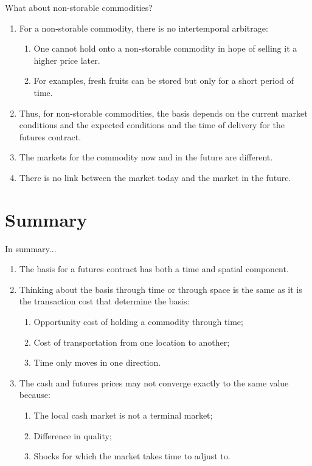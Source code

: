 \documentclass[table,xcolor=pdftex,dvipsnames, handout]{beamer}\usepackage[]{graphicx}\usepackage[]{color}
\begin{document}

\begin{frame}{What about non-storable commodities?}
\begin{enumerate}[label=\textbullet]
    \item For a non-storable commodity, there is no intertemporal arbitrage:
        \begin{enumerate}[label=-]
          \item One cannot hold onto a non-storable commodity in hope of selling it a higher price later.
          \item For examples, fresh fruits can be stored but only for a short period of time.
       \end{enumerate}
    \item Thus, for non-storable commodities, the basis depends on the current market conditions and the expected conditions and the time of delivery for the futures contract.
    \item The markets for the commodity now and in the future are different.
    \item There is no link between the market today and the market in the future.
\end{enumerate}
\end{frame}


\section{Summary}

\begin{frame}{In summary...}
\begin{enumerate}[label=\textbullet]
    \item The basis for a futures contract has both a time and spatial component.
    \item Thinking about the basis through time or through space is the same as it is the transaction cost that determine the basis:
        \begin{enumerate}[label=-]
          \item Opportunity cost of holding a commodity through time;
          \item Cost of transportation from one location to another;
          \item Time only moves in one direction.
        \end{enumerate}
    \item The cash and futures prices may not converge exactly to the same value because:
        \begin{enumerate}[label=-]
          \item The local cash market is not a terminal market;
          \item Difference in quality;
          \item Shocks for which the market takes time to adjust to.
        \end{enumerate}
\end{enumerate}
\end{frame}
\end{document}
